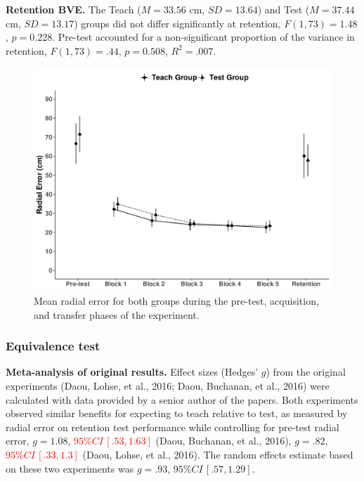 \documentclass[
  english,
  man,floatsintext]{apa7}
\begin{document}
\textbf{Retention BVE.} The Teach (\(M = 33.56\) cm, \(SD = 13.64\)) and Test (\(M = 37.44\) cm, \(SD = 13.17\)) groups did not differ significantly at retention, \(F(1,73) = 1.48\), \(p = 0.228\). Pre-test accounted for a non-significant proportion of the variance in retention, \(F(1, 73) = .44\), \(p = 0.508\), \(R^{2} = .007\).

\begin{figure}

{\centering \includegraphics[width=1\linewidth,height=1\textheight]{../../figs/fig1} 

}

\caption{Mean radial error for both groups during the pre-test, acquisition, and transfer phases of the experiment.}\label{fig:fig1}
\end{figure}

\hypertarget{equivalence-test}{%
\subsubsection{Equivalence test}\label{equivalence-test}}

\textbf{Meta-analysis of original results.} Effect sizes (Hedges' \(g\)) from the original experiments (Daou, Lohse, et al., 2016; Daou, Buchanan, et al., 2016) were calculated with data provided by a senior author of the papers. Both experiments observed similar benefits for expecting to teach relative to test, as measured by radial error on retention test performance while controlling for pre-test radial error, \(g = 1.08\), \textcolor{red}{$95\%CI \,[.53, 1.63]$} (Daou, Buchanan, et al., 2016), \(g = .82\), \textcolor{red}{$95\%CI \,[.33, 1.3]$} (Daou, Lohse, et al., 2016). The random effects estimate based on these two experiments was \(g = .93\), \(95\%CI \,[.57, 1.29]\).
\end{document}

